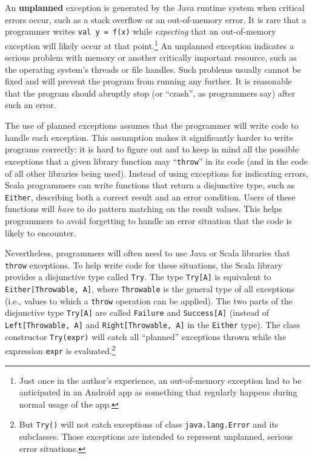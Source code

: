An \textbf{unplanned} exception is generated
by the Java runtime system when critical errors occur, such as a stack
overflow or an out-of-memory error. It is rare that a programmer writes
\lstinline!val y = f(x)! while \emph{expecting} that an out-of-memory
exception will likely occur at that point.\footnote{Just once in the author\textsf{'}s experience, an out-of-memory exception had
to be anticipated in an Android app as something that regularly happens
during normal usage of the app.} An unplanned exception indicates a serious problem with memory or
another critically important resource, such as the operating system\textsf{'}s
threads or file handles. Such problems usually cannot be fixed and
will prevent the program from running any further. It is reasonable
that the program should abruptly stop (or \textsf{``}crash\textsf{''}, as programmers
say) after such an error.

The use of planned exceptions assumes that the programmer will write
code to handle each exception. This assumption makes it significantly
harder to write programs correctly: it is hard to figure out and to
keep in mind all the possible exceptions that a given library function
may \textsf{``}\lstinline!throw!\textsf{''} in its code (and in the code of all other
libraries being used). Instead of using exceptions for indicating
errors, Scala programmers can write functions that return a disjunctive
type, such as \lstinline!Either!, describing both a correct result
and an error condition. Users of these functions will \emph{have}
to do pattern matching on the result values. This helps programmers
to avoid forgetting to handle an error situation that the code is
likely to encounter.

Nevertheless, programmers will often need to use Java or Scala libraries
that \lstinline!throw! exceptions. To help write code for these situations,
the Scala library provides a disjunctive type called \lstinline!Try!.
The type \lstinline!Try[A]! is equivalent to \lstinline!Either[Throwable, A]!,
where \lstinline!Throwable! is the general type of all exceptions
(i.e., values to which a \lstinline!throw! operation can be applied).
The two parts of the disjunctive type \lstinline!Try[A]! are called
\lstinline!Failure! and \lstinline!Success[A]! (instead of \lstinline!Left[Throwable, A]!
and \lstinline!Right[Throwable, A]! in the \lstinline!Either! type).
The class constructor \lstinline!Try(expr)! will catch all \textsf{``}planned\textsf{''}
exceptions thrown while the expression \lstinline!expr! is evaluated.\footnote{But \lstinline!Try()! will not catch exceptions of class \lstinline!java.lang.Error!
and its subclasses. Those exceptions are intended to represent unplanned,
serious error situations.} 

